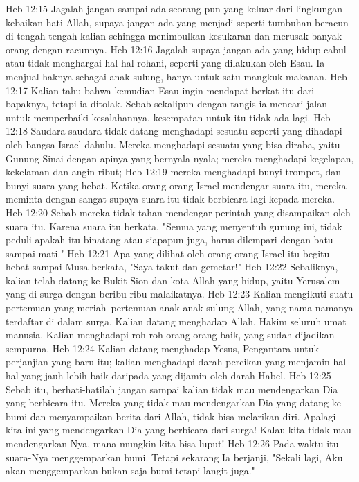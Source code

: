 Heb 12:15  Jagalah jangan sampai ada seorang pun yang keluar dari lingkungan kebaikan hati Allah, supaya jangan ada yang menjadi seperti tumbuhan beracun di tengah-tengah kalian sehingga menimbulkan kesukaran dan merusak banyak orang dengan racunnya.
Heb 12:16  Jagalah supaya jangan ada yang hidup cabul atau tidak menghargai hal-hal rohani, seperti yang dilakukan oleh Esau. Ia menjual haknya sebagai anak sulung, hanya untuk satu mangkuk makanan.
Heb 12:17  Kalian tahu bahwa kemudian Esau ingin mendapat berkat itu dari bapaknya, tetapi ia ditolak. Sebab sekalipun dengan tangis ia mencari jalan untuk memperbaiki kesalahannya, kesempatan untuk itu tidak ada lagi.
Heb 12:18  Saudara-saudara tidak datang menghadapi sesuatu seperti yang dihadapi oleh bangsa Israel dahulu. Mereka menghadapi sesuatu yang bisa diraba, yaitu Gunung Sinai dengan apinya yang bernyala-nyala; mereka menghadapi kegelapan, kekelaman dan angin ribut;
Heb 12:19  mereka menghadapi bunyi trompet, dan bunyi suara yang hebat. Ketika orang-orang Israel mendengar suara itu, mereka meminta dengan sangat supaya suara itu tidak berbicara lagi kepada mereka.
Heb 12:20  Sebab mereka tidak tahan mendengar perintah yang disampaikan oleh suara itu. Karena suara itu berkata, "Semua yang menyentuh gunung ini, tidak peduli apakah itu binatang atau siapapun juga, harus dilempari dengan batu sampai mati."
Heb 12:21  Apa yang dilihat oleh orang-orang Israel itu begitu hebat sampai Musa berkata, "Saya takut dan gemetar!"
Heb 12:22  Sebaliknya, kalian telah datang ke Bukit Sion dan kota Allah yang hidup, yaitu Yerusalem yang di surga dengan beribu-ribu malaikatnya.
Heb 12:23  Kalian mengikuti suatu pertemuan yang meriah--pertemuan anak-anak sulung Allah, yang nama-namanya terdaftar di dalam surga. Kalian datang menghadap Allah, Hakim seluruh umat manusia. Kalian menghadapi roh-roh orang-orang baik, yang sudah dijadikan sempurna.
Heb 12:24  Kalian datang menghadap Yesus, Pengantara untuk perjanjian yang baru itu; kalian menghadapi darah percikan yang menjamin hal-hal yang jauh lebih baik daripada yang dijamin oleh darah Habel.
Heb 12:25  Sebab itu, berhati-hatilah jangan sampai kalian tidak mau mendengarkan Dia yang berbicara itu. Mereka yang tidak mau mendengarkan Dia yang datang ke bumi dan menyampaikan berita dari Allah, tidak bisa melarikan diri. Apalagi kita ini yang mendengarkan Dia yang berbicara dari surga! Kalau kita tidak mau mendengarkan-Nya, mana mungkin kita bisa luput!
Heb 12:26  Pada waktu itu suara-Nya menggemparkan bumi. Tetapi sekarang Ia berjanji, "Sekali lagi, Aku akan menggemparkan bukan saja bumi tetapi langit juga."

